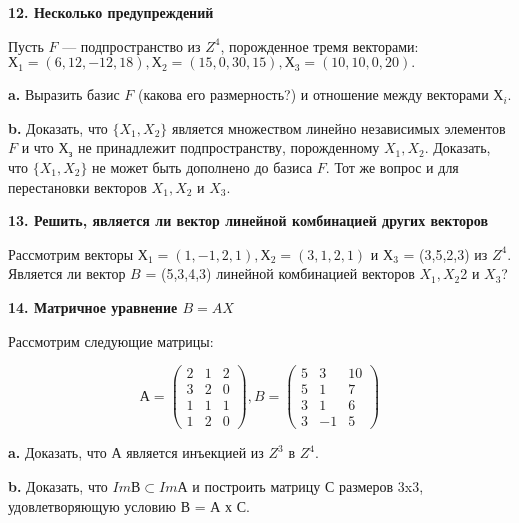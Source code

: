 \documentclass{../template/mai_book}
\begin{document}
\medskip

{\noindent\bf 12. Несколько предупреждений}

\medskip

Пусть $F$ — подпространство из $Z^4$, порожденное тремя векторами:\\ 
$Х_1 = (6,12, -12,18), Х_2 = (15,0,30,15), Х_3 = (10,10,0,20).$

\medskip

{\bf a.} Выразить базис $ F$ (какова его размерность?) и отношение между 
векторами $Х_i$. 

\medskip

{\bf b.} Доказать, что $\{X_1,X_2\}$ является множеством линейно 
независимых элементов $F$ и что $Х_з$ не принадлежит подпространству, 
порожденному $X_1,X_2$. Доказать, что $\{X_1,X_2\}$ не может быть дополнено до 
базиса $F$. Тот же вопрос и для перестановки векторов $X_1,X_2$ и $X_3$. 

\medskip

{\noindent\bf13. Решить, является ли вектор линейной комбинацией 
других векторов}

\medskip

Рассмотрим векторы $Х_1 = (1,-1,2,1), Х_2 = (3,1,2,1)$ и 
$Х_3$ = (3,5,2,3) из $\mathit{Z}^4$. Является ли вектор $B$ = (5,3,4,3) линейной 
комбинацией векторов $X_1,X_2$2 и $X_3$? 

\medskip

{\noindent\bf14. Матричное уравнение $B = AX$}

\medskip

Рассмотрим следующие матрицы: 


$$А =\begin{pmatrix}
2 & 1 & 2 \\
3 & 2 & 0 \\
1 & 1 & 1 \\
1 & 2 & 0 
\end{pmatrix},
B =\begin{pmatrix}
5 & 3 & 10 \\
5 & 1 & 7 \\
3 & 1 & 6 \\
3 & -1 & 5 
\end{pmatrix}$$

\medskip

{\bf a.} Доказать, что А является инъекцией из $\mathit{Z}^3$ в $\mathit{Z}^4$. 

\medskip

{\bf b.} Доказать, что $ImВ \subset ImА$ и построить матрицу С размеров 
3x3, удовлетворяющую условию В = А х С. 
\end{document}
